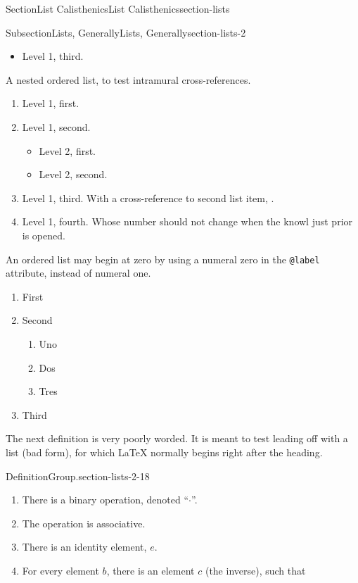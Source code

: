 \documentclass[twoside,10pt,]{article}
\newcommand{\xreffont}{\relax}
\newcommand{\mono}[1]{\texttt{#1}}
\numberwithin{equation}{section}
\begin{document}
\begin{sectionptx}{Section}{List Calisthenics}{}{List Calisthenics}{}{}{section-lists}
\begin{subsectionptx}{Subsection}{Lists, Generally}{}{Lists, Generally}{}{}{section-lists-2}
\begin{itemize}[label=$\blacksquare$]
\begin{itemize}[label=]
\end{itemize}
%
\item{}Level 1, third.%
\end{itemize}
%
\par
A nested ordered list, to test intramural cross-references.%
\begin{enumerate}
\item{}Level 1, first.%
\item\hypertarget{list-item-second}{}Level 1, second.%
\begin{itemize}[label=]
\item{}Level 2, first.%
\item{}Level 2, second.%
\end{itemize}
%
\item{}Level 1, third.  With a cross-reference to second list item, \hyperlink{list-item-second}{{\xreffont 2}}.%
\item{}Level 1, fourth.  Whose number should not change when the knowl just prior is opened.%
\end{enumerate}
%
\par
An ordered list may begin at zero by using a numeral zero in the \mono{@label} attribute, instead of numeral one.%
\begin{enumerate}[label={(\arabic*), start=0}]
\item{}First%
\item{}Second%
\begin{enumerate}[label={-\arabic*-, start=0}]
\item{}Uno%
\item{}Dos%
\item{}Tres%
\end{enumerate}
%
\item{}Third%
\end{enumerate}
%
\par
The next definition is very poorly worded.  It is meant to test leading off with a list (bad form), for which \LaTeX{} normally begins right after the heading.%
\begin{definition}{Definition}{Group.}{section-lists-2-18}%
%
%
\begin{enumerate}[label={\alph*)}]
\item{}There is a binary operation, denoted ``\(\cdot\)''.%
\item{}The operation is associative.%
\item{}There is an identity element, \(e\).%
\item{}For every element \(b\), there is an element \(c\) (the inverse), such that%

\end{enumerate}
\end{definition}
\end{subsectionptx}
\end{sectionptx}
\end{document}
